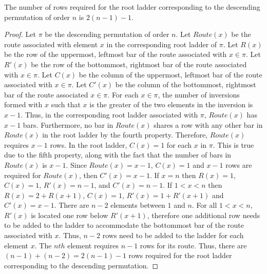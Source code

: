 \begin{theorem}
  The number of rows required for the root ladder corresponding to the descending permutation of order $n$ is $2(n-1) - 1$.
  \label{Theorem:RootHeight}
\end{theorem}
\begin{proof}
	Let $\pi$ be the descending permutation of order $n$. Let $Route(x)$ be the route associated with element $x$ in the corresponding root ladder of $\pi$. 
    Let $R(x)$ be the row of the uppermost, leftmost bar 
    of the route associated with $x \in \pi$. Let $R\prime(x)$ be the row of the bottommost, rightmost bar of the route associated 
    with $x \in \pi$. Let $C(x)$ be the column of the uppermost, leftmost bar of the route associated with $x \in \pi$.
    Let $C\prime(x)$ be the column of the bottommost, rightmost bar of the route associated $x \in \pi$. 
    For each $x \in \pi$, the number of inversions formed with $x$ such that $x$ is the greater of the two 
    elements in the inversion is $x-1$. Thus, in the corresponding root ladder 
    associated with $\pi$, $Route(x)$ has $x-1$ bars. Furthermore, 
    no bar in $Route(x)$ shares a row with any other bar in $Route(x)$ in the root ladder by the fourth property. Therefore, $Route(x)$ requires 
    $x-1$ rows. In the root ladder, $C(x)=1$ for each $x$ in $\pi$. This is true due to the fifth property, along with the fact that the number of 
    bars in $Route(x)$ is $x-1$. Since $Route(x)=x-1$, $C(x)=1$ and $x-1$ rows are 
    required for $Route(x)$, then $C'(x)=x-1$. If $x=n$ then $R(x)=1$, $C(x)=1$, $R\prime(x)=n-1$, and $C\prime(x)=n-1$. 
    If $1 < x < n$ then $R(x) = 2+R(x+1)$, $C(x)=1$, $R\prime(x)=1+R\prime(x+1)$ and $C\prime(x)=x-1$. There are $n-2$ elements 
    between $1$ and $n$. For all $1 < x < n$, $R\prime(x)$ is located one row below $R\prime(x+1)$, therefore one additional row 
    needs to be added to the ladder to accommodate the bottommost bar of the route associated with $x$. Thus, $n-2$ rows 
    need to be added to the ladder for each element $x$. The $nth$ element requires 
    $n-1$ rows for its route. Thus, there are $(n-1)+(n-2)=2(n-1)-1$ rows required for the root ladder corresponding to the descending permutation. 
\end{proof}

